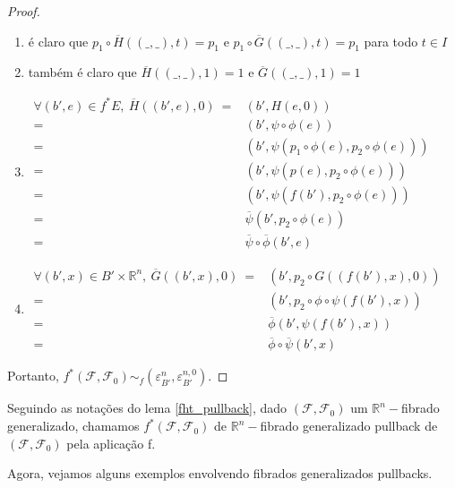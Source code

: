 \documentclass[12pt,oneside]{book} %
\newcommand{\R}{\mathbb{R}}
\begin{document}
\begin{proof}
	\begin{enumerate}
		\item é claro que $p_{1}\circ\overline{H}((\_,\_),t)=p_{1}$ e $p_{1}\circ\overline{G}((\_,\_),t)=p_{1}$ para todo $t\in I$
		\item também é claro que $\overline{H}((\_,\_),1)=1$ e $\overline{G}((\_,\_),1)=1$
		\item $\begin{array}{rl}
			\forall (b',e)\in f^{*}E, \ \overline{H}((b',e),0) \ = & (b',H(e,0)) \\
			= & (b',\psi\circ\phi(e)) \\
			= & (b',\psi(p_{1}\circ\phi(e),p_{2}\circ\phi(e))) \\
			= & (b',\psi(p(e),p_{2}\circ\phi(e))) \\
			= & (b',\psi(f(b'),p_{2}\circ\phi(e))) \\
			= & \overline{\psi}(b',p_{2}\circ\phi(e)) \\
			= & \overline{\psi}\circ\overline{\phi}(b',e)
		\end{array}$
		\item $\begin{array}{rl}
			\forall (b',x)\in B'\times\R^{n}, \ \overline{G}((b',x),0) \ = & (b',p_{2}\circ G((f(b'),x),0)) \\
			= & (b',p_{2}\circ\phi\circ\psi(f(b'),x)) \\
			= & \overline{\phi}(b',\psi(f(b'),x)) \\
			= & \overline{\phi}\circ\overline{\psi}(b',x)
		\end{array}$
	\end{enumerate}
	
	\par Portanto, $f^{*}(\mathcal{F},\mathcal{F}_{0})\sim_{f}(\varepsilon_{B'}^{n},\varepsilon_{B'}^{n,0})$.
	
\end{proof}

\par Seguindo as notações do lema \ref{fht_pullback}, dado $(\mathcal{F},\mathcal{F}_{0})$ um $\R^{n}-$fibrado generalizado, chamamos $f^{*}(\mathcal{F},\mathcal{F}_{0})$ de $\R^{n}-$fibrado generalizado pullback de $(\mathcal{F},\mathcal{F}_{0})$ pela aplicação f.

\par Agora, vejamos alguns exemplos envolvendo fibrados generalizados pullbacks.
\end{document}
